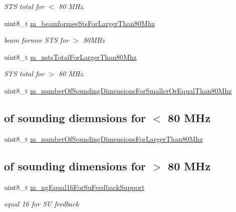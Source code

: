 \begin{DoxyCompactItemize}
\begin{DoxyCompactList}\small\item\em S\+TS total for $<$ 80 M\+Hz. \end{DoxyCompactList}\item 
uint8\+\_\+t \hyperlink{classns3_1_1HeCapabilities_a14af7669973c17c133210eb5c6e05e74}{m\+\_\+beamformee\+Sts\+For\+Larger\+Than80\+Mhz}
\begin{DoxyCompactList}\small\item\em beam formee S\+TS for $>$ 80\+M\+Hz \end{DoxyCompactList}\item 
uint8\+\_\+t \hyperlink{classns3_1_1HeCapabilities_aca46963765d4cbf624622a602994b52b}{m\+\_\+nsts\+Total\+For\+Larger\+Than80\+Mhz}
\begin{DoxyCompactList}\small\item\em S\+TS total for $>$ 80 M\+Hz. \end{DoxyCompactList}\item 
uint8\+\_\+t \hyperlink{classns3_1_1HeCapabilities_af3b6c564e48d20f968a8adbf633f96f4}{m\+\_\+number\+Of\+Sounding\+Dimensions\+For\+Smaller\+Or\+Equal\+Than80\+Mhz}
\begin{DoxyCompactList}\small\item\em \subsection*{of sounding diemnsions for $<$ 80 M\+Hz}\end{DoxyCompactList}\item 
uint8\+\_\+t \hyperlink{classns3_1_1HeCapabilities_adc37633e6922c3260546c0fd91998873}{m\+\_\+number\+Of\+Sounding\+Dimensions\+For\+Larger\+Than80\+Mhz}
\begin{DoxyCompactList}\small\item\em \subsection*{of sounding dimensions for $>$ 80 M\+Hz}\end{DoxyCompactList}\item 
uint8\+\_\+t \hyperlink{classns3_1_1HeCapabilities_a89285fdd2f026cb824f43506cfc3c88e}{m\+\_\+ng\+Equal16\+For\+Su\+Feedback\+Support}
\begin{DoxyCompactList}\small\item\em equal 16 for SU feedback \end{DoxyCompactList}\item 

\end{DoxyCompactItemize}
